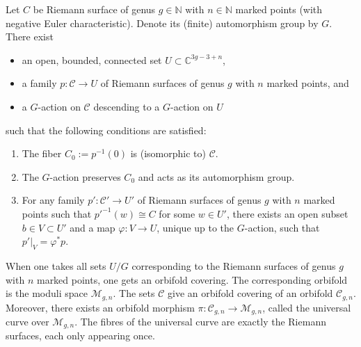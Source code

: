     \begin{property}
        Let $C$ be Riemann surface of genus $g\in\mathbb{N}$ with $n\in\mathbb{N}$ marked points (with negative Euler characteristic). Denote its (finite) automorphism group by $G$. There exist
        \begin{itemize}
            \item an open, bounded, connected set $U\subset\mathbb{C}^{3g-3+n}$,
            \item a family $p:\mathcal{C}\rightarrow U$ of Riemann surfaces of genus $g$ with $n$ marked points, and
            \item a $G$-action on $\mathcal{C}$ descending to a $G$-action on $U$
        \end{itemize}
        such that the following conditions are satisfied:
        \begin{enumerate}
            \item The fiber $C_0:=p^{-1}(0)$ is (isomorphic to) $\mathcal{C}$.
            \item The $G$-action preserves $C_0$ and acts as its automorphism group.
            \item For any family $p':\mathcal{C}'\rightarrow U'$ of Riemann surfaces of genus $g$ with $n$ marked points such that $p'^{-1}(w)\cong C$ for some $w\in U'$, there exists an open subset $b\in V\subset U'$ and a map $\varphi:V\rightarrow U$, unique up to the $G$-action, such that $p'|_V=\varphi^*p$.
        \end{enumerate}

        When one takes all sets $U/G$ corresponding to the Riemann surfaces of genus $g$ with $n$ marked points, one gets an orbifold covering. The corresponding orbifold is the moduli space $\mathcal{M}_{g,n}$. The sets $\mathcal{C}$ give an orbifold covering of an orbifold $\mathcal{C}_{g,n}$. Moreover, there exists an orbifold morphism $\pi:\mathcal{C}_{g,n}\rightarrow\mathcal{M}_{g,n}$, called the universal curve over $\mathcal{M}_{g,n}$. The fibres of the universal curve are exactly the Riemann surfaces, each only appearing once.
    \end{property}

